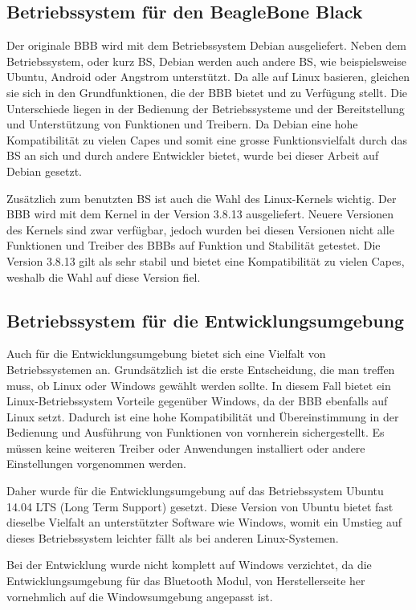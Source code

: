 \subsection{Betriebssystem für den BeagleBone Black}
Der originale BBB wird mit dem Betriebssystem Debian ausgeliefert. Neben dem Betriebssystem, oder kurz BS, Debian werden auch andere BS, wie beispielsweise Ubuntu, Android oder Angstrom unterstützt. Da alle auf Linux basieren, gleichen sie sich in den Grundfunktionen, die der BBB bietet und zu Verfügung stellt. Die Unterschiede liegen in der Bedienung der Betriebssysteme und der Bereitstellung und Unterstützung von Funktionen und Treibern. Da Debian eine hohe Kompatibilität zu vielen Capes und somit eine grosse Funktionsvielfalt durch das BS an sich und durch andere Entwickler bietet, wurde bei dieser Arbeit auf Debian gesetzt. 

Zusätzlich zum benutzten BS ist auch die Wahl des Linux-Kernels wichtig. Der BBB wird mit dem Kernel in der Version 3.8.13 ausgeliefert. Neuere Versionen des Kernels sind zwar verfügbar, jedoch wurden bei diesen Versionen nicht alle Funktionen und Treiber des BBBs auf Funktion und Stabilität getestet. Die Version 3.8.13 gilt als sehr stabil und bietet eine Kompatibilität zu vielen Capes, weshalb die Wahl auf diese Version fiel.



\subsection{Betriebssystem für die Entwicklungsumgebung}
Auch für die Entwicklungsumgebung bietet sich eine Vielfalt von Betriebssystemen an. Grundsätzlich ist die erste Entscheidung, die man treffen muss, ob Linux oder Windows gewählt werden sollte.
In diesem Fall bietet ein Linux-Betriebssystem Vorteile gegenüber Windows, da der BBB ebenfalls auf Linux setzt. Dadurch ist eine hohe Kompatibilität und Übereinstimmung in der Bedienung und Ausführung von Funktionen von vornherein sichergestellt. Es müssen keine weiteren Treiber oder Anwendungen installiert oder andere Einstellungen vorgenommen werden.

Daher wurde für die Entwicklungsumgebung auf das Betriebssystem Ubuntu 14.04 LTS (Long Term Support) gesetzt. Diese Version von Ubuntu bietet fast dieselbe Vielfalt an unterstützter Software wie Windows, womit ein Umstieg auf dieses Betriebssystem leichter fällt als bei anderen Linux-Systemen.

Bei der Entwicklung wurde nicht komplett auf Windows verzichtet, da die Entwicklungsumgebung für das Bluetooth Modul, von Herstellerseite her vornehmlich auf die Windowsumgebung angepasst ist.